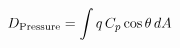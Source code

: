 \documentclass[preview]{standalone}
\begin{document}
\begin{align*}
\special{dvisvgm:raw <g id='unique000'>}D_{\text{Pressure}} = \int q\,C_p\cos\theta\,dA\special{dvisvgm:raw </g>}
\end{align*}
\end{document}
